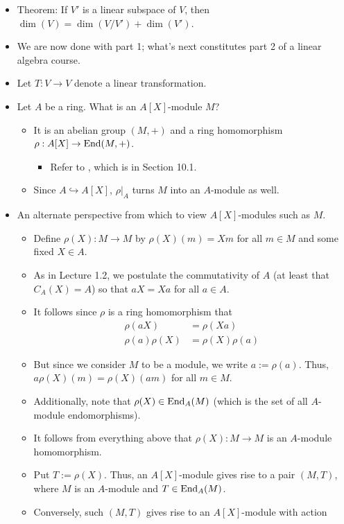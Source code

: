 \documentclass[../notes.tex]{subfiles}
\begin{document}
\begin{itemize}
    \item Theorem: If $V'$ is a linear subspace of $V$, then $\dim(V)=\dim(V/V')+\dim(V')$.
    \item We are now done with part 1; what's next constitutes part 2 of a linear algebra course.
    \item Let $T:V\to V$ denote a linear transformation.
    \item Let $A$ be a ring. What is an $A[X]$-module $M$?
    \begin{itemize}
        \item It is an abelian group $(M,+)$ and a ring homomorphism $\rho:A[X]\to\operatorname{End}(M,+)$.
        \begin{itemize}
            \item Refer to \textcite[340-42]{bib:DummitFoote}, which is in Section 10.1.
        \end{itemize}
        \item Since $A\hookrightarrow A[X]$, $\rho|_A$ turns $M$ into an $A$-module as well.
    \end{itemize}
    \item An alternate perspective from which to view $A[X]$-modules such as $M$.
    \begin{itemize}
        \item Define $\rho(X):M\to M$ by $\rho(X)(m)=Xm$ for all $m\in M$ and some fixed $X\in A$.
        \item As in Lecture 1.2, we postulate the commutativity of $A$ (at least that $C_A(X)=A$) so that $aX=Xa$ for all $a\in A$.
        \item It follows since $\rho$ is a ring homomorphism that
        \begin{align*}
            \rho(aX) &= \rho(Xa)\\
            \rho(a)\rho(X) &= \rho(X)\rho(a)
        \end{align*}
        \item But since we consider $M$ to be a module, we write $a:=\rho(a)$. Thus, $a\rho(X)(m)=\rho(X)(am)$ for all $m\in M$.
        \item Additionally, note that $\rho(X)\in\operatorname{End}_A(M)$ (which is the set of all $A$-module endomorphisms).
        \item It follows from everything above that $\rho(X):M\to M$ is an $A$-module homomorphism.
        \item Put $T:=\rho(X)$. Thus, an $A[X]$-module gives rise to a pair $(M,T)$, where $M$ is an $A$-module and $T\in\operatorname{End}_A(M)$.
        \item Conversely, such $(M,T)$ gives rise to an $A[X]$-module with action

\end{itemize}
\end{itemize}
\end{document}
